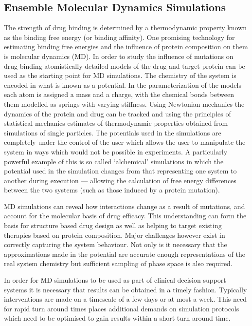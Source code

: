 \subsection{Ensemble Molecular Dynamics Simulations}

The strength of drug binding is determined by a thermodynamic property known
as the binding free energy (or binding affinity). One promising technology for
estimating binding free energies and the influence of protein composition on
them is molecular dynamics (MD). In order to study the influence of mutations
on drug binding atomistically detailed models of the drug and target protein
can be used as the starting point for MD simulations. The chemistry of the
system is encoded in what is known as a potential. \cite{Karplus2002} In the
parameterization of the models each atom is assigned a mass and a charge, with
the chemical bonds between them modelled as springs with varying stiffness.
Using Newtonian mechanics the dynamics of the protein and drug can be tracked
and using the principles of statistical mechanics estimates of thermodynamic
properties obtained from simulations of single particles. The potentials used
in the simulations are completely under the control of the user which allows
the user to manipulate the system in ways which would not be possible in
experiments. A particularly powerful example of this is so called `alchemical'
simulations in which the potential used in the simulation changes from that
representing one system to another during execution — allowing the calculation
of free energy differences between the two systems (such as those induced by a
protein mutation).

MD simulations can reveal how interactions change as a result of mutations,
and account for the molecular basis of drug efficacy. This understanding can
form the basis for structure based drug design as well as helping to target
existing therapies based on protein composition. Major challenges however
exist in correctly capturing the system behaviour. Not only is it necessary
that the approximations made in the potential are accurate enough
representations of the real system chemistry but sufficient sampling of phase
space is also required. 

In order for MD simulations to be used as part of clinical decision support
systems it is necessary that results can be obtained in a timely fashion.
Typically interventions are made on a timescale of a few days or at most a
week. This need for rapid turn around times places additional demands on
simulation protocols which need to be optimised to gain results within a short
turn around time.

